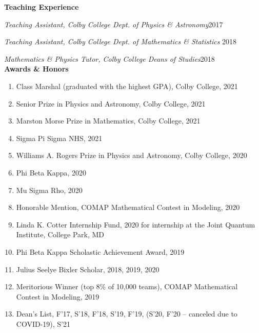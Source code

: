 \documentclass[10pt]{article}
\begin{document}
\noindent \large{{\textbf{Teaching Experience}}} \normalsize \\ 

\vspace{-5pt}

\noindent \textit{Teaching Assistant, Colby College Dept. of Physics \& Astronomy}\hfill 2017 

\noindent \textit{Teaching Assistant, Colby College Dept. of Mathematics \& Statistics} \hfill 2018 

\noindent \textit{Mathematics \& Physics Tutor, Colby College Deans of Studies}\hfill 2018\\


\noindent \large{\textbf{{Awards \& Honors }}}  \normalsize 

\begin{enumerate}
	\setlength\itemsep{-4pt}
	\item Class Marshal (graduated with the highest GPA), Colby College, {2021}
	\item Senior Prize in Physics and Astronomy, Colby College, {2021}
	\item Marston Morse Prize in Mathematics, Colby College, {2021}
	\item Sigma Pi Sigma NHS, {2021}
	\item {Williams A. Rogers Prize in Physics and Astronomy}, Colby College, {2020} 
	\item {Phi Beta Kappa}, {2020} 
	\item {Mu Sigma Rho}, {2020}
	\item {Honorable Mention,}  COMAP Mathematical Contest in Modeling, {2020}
	\item {Linda K. Cotter Internship Fund}, {2020} for internship at the Joint Quantum Institute, College Park, MD
	\item {Phi Beta Kappa Scholastic Achievement Award,} {2019}
	\item {Julius Seelye Bixler Scholar,} {2018, 2019, 2020}
	\item {Meritorious Winner (top 8\% of 10,000 teams),}  COMAP Mathematical Contest in Modeling, {2019}
	\item {Dean’s List}, {F'17, S'18, F'18, S'19, F'19, (S'20, F'20 -- canceled due to COVID-19), S'21}
\end{enumerate}
\end{document}
